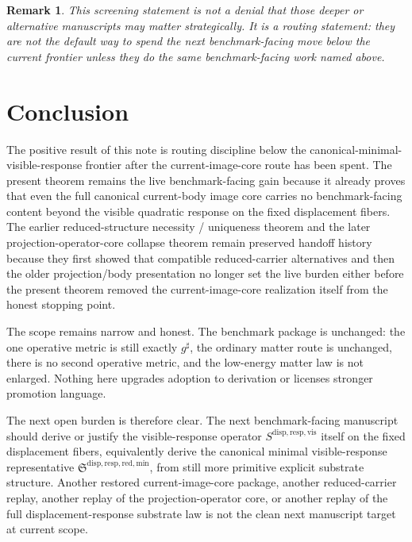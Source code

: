 \documentclass[11pt]{article}
\newcommand{\CompletedMetric}{g^{\sharp}}
\newcommand{\VisibleResponseOperator}{S^{\mathrm{disp,resp,vis}}}
\newcommand{\MinimalReducedStructure}{\mathfrak S^{\mathrm{disp,resp,red,min}}}
\newtheorem{remark}{Remark}
\begin{document}
\begin{remark}
This screening statement is not a denial that those deeper or alternative manuscripts may matter strategically. It is a routing statement: they are not the default way to spend the next benchmark-facing move below the current frontier unless they do the same benchmark-facing work named above.
\end{remark}

\section{Conclusion}

The positive result of this note is routing discipline below the canonical-minimal-visible-response frontier after the current-image-core route has been spent. The present theorem remains the live benchmark-facing gain because it already proves that even the full canonical current-body image core carries no benchmark-facing content beyond the visible quadratic response on the fixed displacement fibers. The earlier reduced-structure necessity / uniqueness theorem and the later projection-operator-core collapse theorem remain preserved handoff history because they first showed that compatible reduced-carrier alternatives and then the older projection/body presentation no longer set the live burden either before the present theorem removed the current-image-core realization itself from the honest stopping point.

The scope remains narrow and honest. The benchmark package is unchanged: the one operative metric is still exactly \(\CompletedMetric\), the ordinary matter route is unchanged, there is no second operative metric, and the low-energy matter law is not enlarged. Nothing here upgrades adoption to derivation or licenses stronger promotion language.

The next open burden is therefore clear. The next benchmark-facing manuscript should derive or justify the visible-response operator \(\VisibleResponseOperator\) itself on the fixed displacement fibers, equivalently derive the canonical minimal visible-response representative \(\MinimalReducedStructure\), from still more primitive explicit substrate structure. Another restored current-image-core package, another reduced-carrier replay, another replay of the projection-operator core, or another replay of the full displacement-response substrate law is not the clean next manuscript target at current scope.
\end{document}
